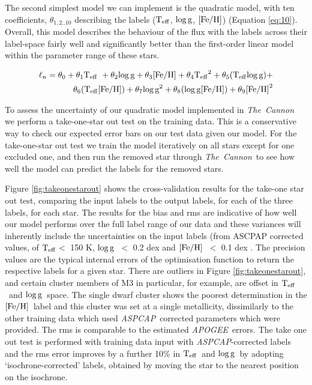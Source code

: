 \documentclass[12pt, preprint]{aastex}
\newcommand{\teff}{\mbox{$\rm T_{eff}$}}
\newcommand{\feh}{\mbox{$\rm [Fe/H]$}}
\newcommand{\logg}{\mbox{$\rm \log g$}}
\newcommand{\tc}{\textsl{The~Cannon}}
\newcommand{\apogee}{\textsl{APOGEE}}
\newcommand{\aspcap}{\textsl{ASPCAP}}
\begin{document}
The second simplest model we can implement is the quadratic model, with ten coefficients, $\theta_{1,2..10}$ describing the labels (\teff, \logg, \feh) (Equation \ref{eq:10}).  Overall, this model describes the behaviour of the flux with the labels across their label-space fairly well and significantly better than the first-order linear model within the parameter range of these stars. 

\begin{equation}
\begin{split}
\ell_n = \theta_0 + \theta_1 \teff\ + \theta_2 \logg + \theta_3 \feh + \theta_4 \teff^2 + \theta_5 (\teff \logg) + \\
\theta_6 (\teff \feh) + \theta_7 \logg^2 + \theta_8 (\logg \feh) + \theta_9 \feh^2
\end{split}
 \label{eq:10}
 \end{equation}

To assess the uncertainty of our quadratic model implemented in \tc\, we perform a take-one-star out test on the training data. This is a conservative way to check our expected error bars on our test data given our model. For the take-one-star out test we train the model iteratively on all stars except for one excluded one, and then run the removed star through \tc\, to see how well the model can predict the labels for the removed stars. 

Figure \ref{fig:takeonestarout} shows the cross-validation results for the take-one star out test, comparing the input labels to the output labels, for each of the three labels, for each star. The results for the bias and rms are indicative of how well our model performs over the full label range of our data and these variances will inherently include the uncertainties on the input labels (from ASCPAP corrected values, of \teff $<$ 150 K, \logg\ $<$ 0.2 dex and \feh\ $<$ 0.1 dex \citep{Meszaros2013}. The precision values are the typical internal errors of the optimisation function to return the respective labels for a given star. There are outliers in Figure \ref{fig:takeonestarout}, and certain cluster members of M3 in particular, for example,  are offset in \teff\ and \logg\ space. The single dwarf cluster shows the poorest determination in the \feh\ label and this cluster was set at a single metallicity, dissimilarly to the other training data which used \aspcap\ corrected parameters which were provided. The rms is comparable to the estimated \apogee\ errors. The take one out test is performed with training data input with \aspcap-corrected labels and the rms error improves by a further 10\% in \teff\ and \logg\  by adopting `isochrone-corrected' labels, obtained by moving the star to the nearest position on the isochrone. 
\end{document}
